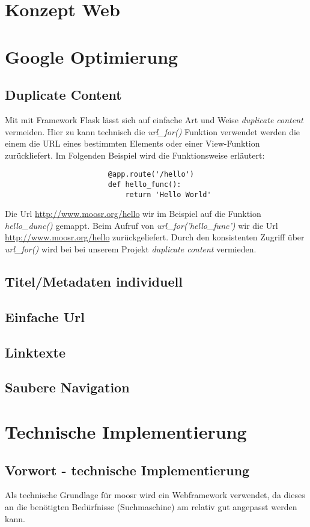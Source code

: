 \documentclass[11pt]{scrreprt}
\begin{document}
\chapter{Konzept Web}

\chapter{Google Optimierung}
\section{Duplicate Content}
Mit mit Framework Flask lässt sich auf einfache Art und Weise \emph{duplicate
content} vermeiden. Hier zu kann technisch die \emph{url\_for()} Funktion
verwendet werden die einem die URL eines bestimmten Elements oder einer
View-Funktion zurückliefert. Im Folgenden Beispiel wird die Funktionsweise
erläutert:
\begin{verbatim}
                        @app.route('/hello')
                        def hello_func():
                            return 'Hello World'
\end{verbatim}

Die Url \url{http://www.moosr.org/hello} wir im Beispiel auf die Funktion
\emph{hello\_dunc()} gemappt. Beim Aufruf von \emph{url\_for('hello\_func')} wir
die Url \url{http://www.moosr.org/hello} zurückgeliefert. Durch den konsistenten
Zugriff über \emph{url\_for()} wird bei bei unserem Projekt
\emph{duplicate content} vermieden.


\section{Titel/Metadaten individuell}
\section{Einfache Url}
\section{Linktexte}
\section{Saubere Navigation}


\chapter{Technische Implementierung}
\section{Vorwort - technische Implementierung}
Als technische Grundlage für moosr wird ein Webframework verwendet, da dieses an
die benötigten Bedürfnisse (Suchmaschine) am relativ gut angepasst werden kann.
\end{document}
